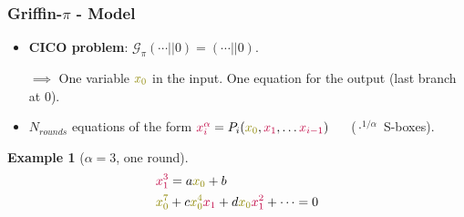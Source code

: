 \documentclass[aspectratio=169]{beamer}
\newtheorem{exemple}{Example}
\begin{document}
\begin{frame}
  \frametitle{Griffin-$\pi$ - Model}
  \begin{itemize}
  \item \textbf{CICO problem}: $\mathcal{G}_\pi(\cdots || 0) = (\cdots || 0)$.

    $\implies$ One variable $\textcolor{olive}{x_0}$ in the input. One equation for the output (last branch at 0).
  \item $N_{rounds}$ equations of the form $\textcolor{purple}{x_i^\alpha} = P_i(\textcolor{olive}{x_0}, \textcolor{purple}{x_1}, \ldots \textcolor{purple}{x_{i-1}})$ $\quad$ ($\cdot^{1/\alpha}$ S-boxes).
  \end{itemize}

  \pause
  \begin{exemple}[$\alpha = 3$, one round]
    \vspace{-20pt}
    \begin{align*}
      &\textcolor{purple}{x_1^3} = a\textcolor{olive}{x_0} + b \\
      &\textcolor{olive}{x_0^7} + c\textcolor{olive}{x_0^4}\textcolor{purple}{x_1} + d\textcolor{olive}{x_0}\textcolor{purple}{x_1^2} + \cdots = 0
    \end{align*}

  \end{exemple}
\end{frame}
\end{document}
